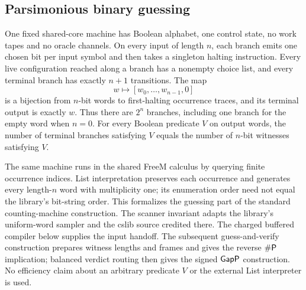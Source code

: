 \begin{result}
\subsection{Parsimonious binary guessing}
One fixed shared-core machine has Boolean alphabet, one control state, no work
tapes and no oracle channels. On every input of length $n$, each branch emits one
chosen bit per input symbol and then takes a singleton halting instruction.
Every live configuration reached along a branch has a nonempty choice list,
and every terminal branch has exactly $n+1$ transitions. The map
\[
  w\longmapsto [w_0,\ldots,w_{n-1},0]
\]
is a bijection from $n$-bit words to first-halting occurrence traces, and its
terminal output is exactly $w$. Thus there are $2^n$ branches, including one
branch for the empty word when $n=0$. For every Boolean predicate $V$ on output
words, the number of terminal branches satisfying $V$ equals the number of
$n$-bit witnesses satisfying $V$.

The same machine runs in the shared FreeM calculus by querying finite occurrence
indices. List interpretation preserves each occurrence and generates every
length-$n$ word with multiplicity one; its enumeration order need not equal the
library's bit-string order. This formalizes the guessing part of the standard
counting-machine construction.\citep{Valiant1979}
The scanner invariant adapts the library's uniform-word sampler and the cslib
source credited there. The charged buffered compiler below supplies the input
handoff. The subsequent guess-and-verify construction prepares witness lengths
and frames and gives the reverse $\#\mathsf{P}$ implication; balanced verdict routing
then gives the signed $\mathsf{GapP}$ construction. No efficiency claim about an arbitrary predicate $V$
or the external List interpreter is used.
\end{result}

